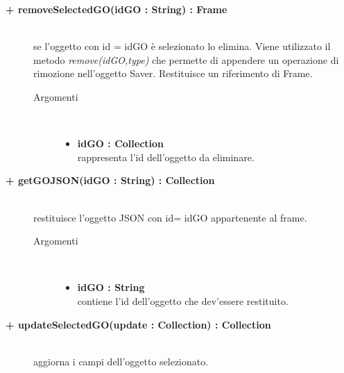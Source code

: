 \begin{description}
\begin{description}
\begin{description}
\begin{description}
\end{description}

\end{description}

\begin{description}
		\item[\textbf{\color{blue}+ removeSelectedGO(idGO : String) : Frame			}] \hfill \\
			se l'oggetto con id = idGO è selezionato lo elimina. Viene utilizzato il metodo \textit{remove(idGO,type)} che permette di appendere un operazione di rimozione nell'oggetto Saver. Restituisce un riferimento di Frame.

\begin{description}
			\item[Argomenti] \hfill \\
				\begin{itemize}
						\item \textbf{idGO : Collection			} \hfill \\
						rappresenta l'id dell'oggetto da eliminare.
				\end{itemize}

\end{description}

\end{description}

\begin{description}
		\item[\textbf{\color{blue}+ getGOJSON(idGO : String) : Collection			}] \hfill \\
			restituisce l'oggetto JSON con id= idGO appartenente al frame.   

\begin{description}
			\item[Argomenti] \hfill \\
				\begin{itemize}
						\item \textbf{idGO : String			} \hfill \\
					contiene l'id dell'oggetto che dev'essere restituito.
				\end{itemize}

\end{description}

\end{description}

\begin{description}
		\item[\textbf{\color{blue}+ updateSelectedGO(update : Collection) : Collection			}] \hfill \\
			aggiorna i campi dell'oggetto selezionato.   


\end{description}
\end{description}
\end{description}
